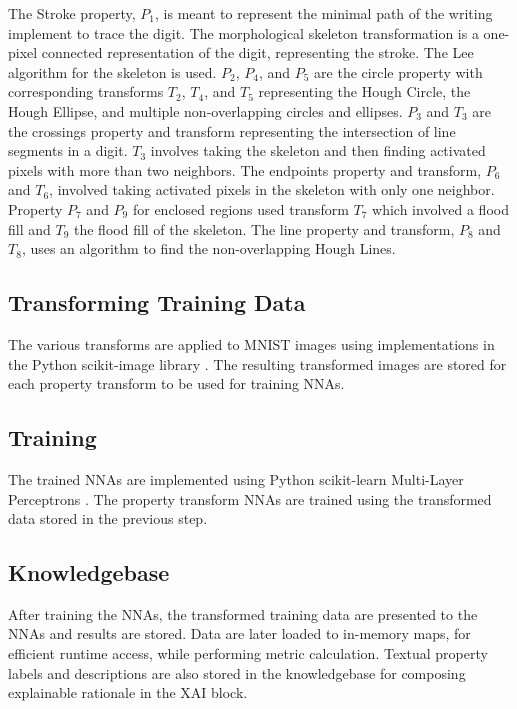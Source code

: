 \documentclass[conference]{IEEEtran}
\begin{document}
The Stroke property, $P_1$, is meant to represent the minimal path of the writing implement to trace the digit.  The morphological skeleton transformation is a one-pixel connected representation of the digit,  representing the stroke.  The Lee\cite{Lee1994} algorithm for the skeleton is used.
$P_2$, $P_4$, and $P_5$ are the circle property with corresponding transforms $T_2$, $T_4$, and $T_5$ representing the Hough Circle, the Hough Ellipse, and multiple non-overlapping circles and ellipses.
$P_3$ and $T_3$ are the crossings property and transform representing the intersection of line segments in a digit.  $T_3$ involves taking the skeleton and then finding activated pixels with more than two neighbors.   The endpoints property and transform, $P_6$ and $T_6$, involved taking activated pixels in the skeleton with only one neighbor.
Property $P_7$ and $P_9$ for enclosed regions used transform $T_7$ which involved a flood fill and $T_9$ the flood fill of the skeleton.  The line property and transform, $P_8$ and $T_8$, uses an algorithm to find the non-overlapping Hough Lines.

\subsection{Transforming Training Data}

The various transforms are applied to MNIST images using implementations in the Python scikit-image library \cite{scikitimage}.  The resulting transformed images are stored for each property transform to be used for training NNAs.

\subsection{Training}

The trained NNAs are implemented using Python scikit-learn Multi-Layer Perceptrons \cite{scikitlearn}.  The property transform NNAs are trained using the transformed data stored in the previous step.

\subsection{Knowledgebase}

After training the NNAs, the transformed training data are presented to the NNAs and results are stored.  Data are later loaded to in-memory maps,  for efficient runtime access, while performing metric calculation.  Textual property labels and descriptions are also stored in the knowledgebase for composing explainable rationale in the XAI block.
\end{document}
